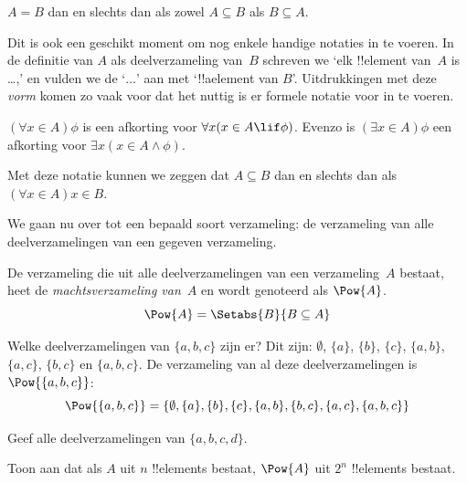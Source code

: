 \documentclass[../../../include/open-logic-section]{subfiles}
\begin{document}
\begin{prop}
$A = B$ dan en slechts dan als zowel $A \subseteq B$ als
$B \subseteq A$.
\end{prop}

Dit is ook een geschikt moment om nog enkele handige notaties in te
voeren. In de definitie van $A$ als deelverzameling van~$B$ schreven
we ‘elk !!{element} van~$A$ is \dots,’ en vulden we de ‘$\dots$’ aan
met ‘!!a{element} van $B$’. Uitdrukkingen met deze \emph{vorm} komen
zo vaak voor dat het nuttig is er formele notatie voor in te voeren.

\begin{defn}
$(\forall x \in A)\phi$ is een afkorting voor $\forall x(x \in A \lif
\phi)$. Evenzo is $(\exists x \in A)\phi$ een afkorting voor $\exists
x(x \in A \land \phi)$.
\end{defn}

Met deze notatie kunnen we zeggen dat $A \subseteq B$ dan en slechts
dan als $(\forall x \in A)x \in B$.

We gaan nu over tot een bepaald soort verzameling: de verzameling van
alle deelverzamelingen van een gegeven verzameling.

\begin{defn}[Machtsverzameling]
De verzameling die uit alle deelverzamelingen van een verzameling~$A$
bestaat, heet de \emph{machtsverzameling van}~$A$ en wordt genoteerd
als $\Pow{A}$.
  \[
    \Pow{A} = \Setabs{B}{B \subseteq A} 
  \]
\end{defn}

\begin{ex}
Welke deelverzamelingen van $\{ a, b, c \}$ zijn er? Dit zijn:
$\emptyset$, $\{a \}$, $\{b\}$, $\{c\}$, $\{a, b\}$, $\{a, c\}$,
$\{b, c\}$ en $\{a, b, c\}$. De verzameling van al deze
deelverzamelingen is $\Pow{\{a,b,c\}}$:
\[
\Pow{\{ a, b, c \}} = \{\emptyset, \{a \}, \{b\}, \{c\}, \{a, b\},
\{b, c\}, \{a, c\}, \{a, b, c\}\}
\]
\end{ex}

\begin{prob}
Geef alle deelverzamelingen van $\{a, b, c, d\}$.
\end{prob}

\begin{prob}
Toon aan dat als $A$ uit $n$ !!{element}s bestaat, $\Pow{A}$ uit
$2^n$ !!{element}s bestaat.
\end{prob}
\end{document}
